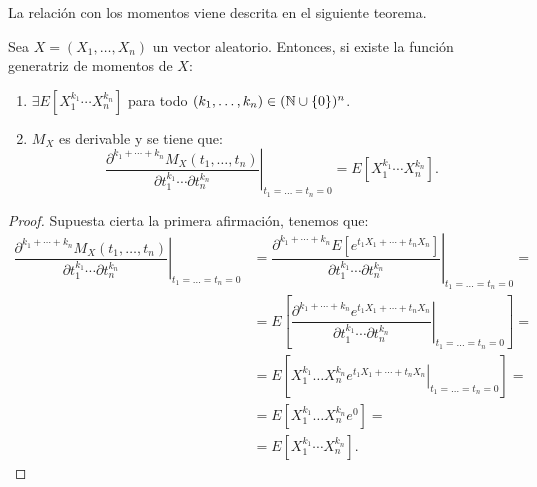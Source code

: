 La relación con los momentos viene descrita en el siguiente teorema.
\begin{teo}
    Sea $X=(X_1,\dots,X_n)$ un vector aleatorio. Entonces, si existe la función generatriz de momentos de $X$:
    \begin{enumerate}
        \item $\exists E[X_1^{k_1}\cdots X_n^{k_n}]$ para todo $(k_1,\dots,k_n)\in (\mathbb{N}\cup \{0\})^n$.
        \item $M_X$ es derivable y se tiene que:
        \begin{equation*}
            \left.\dfrac{\partial^{k_1+\cdots+k_n} M_X(t_1,\dots,t_n)}{\partial t_1^{k_1}\cdots \partial t_n^{k_n}}\right|_{t_1=\dots=t_n=0} = E[X_1^{k_1}\cdots X_n^{k_n}].
        \end{equation*}
    \end{enumerate}
\end{teo}
\begin{proof}
    Supuesta cierta la primera afirmación, tenemos que:
    \begin{align*}
        \left.\dfrac{\partial^{k_1+\cdots+k_n} M_X(t_1,\dots,t_n)}{\partial t_1^{k_1}\cdots \partial t_n^{k_n}}\right|_{t_1=\dots=t_n=0} &= \left.\dfrac{\partial^{k_1+\cdots+k_n} E[e^{t_1X_1+\cdots+t_nX_n}]}{\partial t_1^{k_1}\cdots \partial t_n^{k_n}}\right|_{t_1=\dots=t_n=0} =\\
        &= E\left[\left.\dfrac{\partial^{k_1+\cdots+k_n} e^{t_1X_1+\cdots+t_nX_n}}{\partial t_1^{k_1}\cdots \partial t_n^{k_n}}\right|_{t_1=\dots=t_n=0}\right] =\\
        &= E\left[\left.X_1^{k_1}\dots X_n^{k_n}e^{t_1X_1+\cdots+t_nX_n}\right|_{t_1=\dots=t_n=0}\right] =\\
        &= E\left[X_1^{k_1}\dots X_n^{k_n}e^{0}\right] =\\
        &= E[X_1^{k_1}\cdots X_n^{k_n}].
    \end{align*}
\end{proof}

